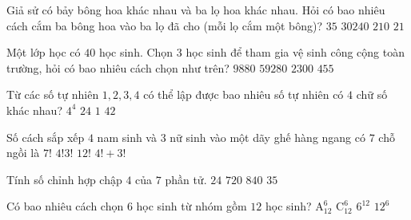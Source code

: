 \begin{ex}%
	Giả sử có bảy bông hoa khác nhau và ba lọ hoa khác nhau. Hỏi có bao nhiêu cách cắm ba bông hoa vào ba lọ đã cho (mỗi lọ cắm một bông)?
	\choice
	{$35$}
	{$30240$}
	{\True $210$}
	{$21$}
\end{ex}

\begin{ex}%
	Một lớp học có $40$ học sinh. Chọn $3$ học sinh để tham gia vệ sinh công cộng toàn trường, hỏi có bao nhiêu cách chọn như trên?
	\choice
	{\True $ 9880$}
	{$ 59280$}
	{$ 2300$}
	{$ 455$}
\end{ex}

\begin{ex}%
	Từ các số tự nhiên $1,2,3,4$ có thể lập được bao nhiêu số tự nhiên có  $4$ chữ số khác nhau?
	\choice
	{$4^4$}
	{\True $ 24$}
	{$ 1$}
	{$ 42$}
\end{ex}
\begin{ex}%
	Số cách sắp xếp $4$ nam sinh và $3$ nữ sinh vào một dãy ghế hàng ngang có $7$ chỗ ngồi là
	\choice
	{\True $7!$}
	{$4!3!$}
	{$12!$}
	{$4!+3!$}
\end{ex}

\begin{ex}%
	Tính số chỉnh hợp chập $4$ của $7$ phần tử.
	\choice
	{$ 24 $}
	{$ 720 $}
	{\True $ 840 $}
	{$ 35 $}
\end{ex}
\begin{ex}%
	Có bao nhiêu cách chọn $6$ học sinh từ nhóm gồm $12$ học sinh? 
	\choice
	{$\mathrm{A}^6_{12}$}
	{\True $\mathrm{C}^6_{12}$}
	{$6^{12}$}
	{$12^6$}
\end{ex}

